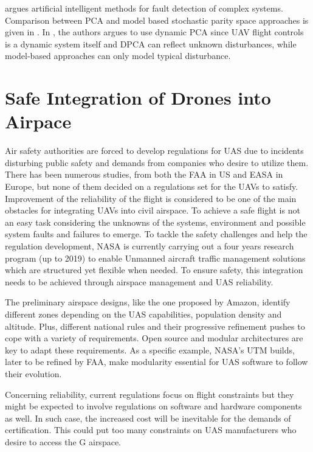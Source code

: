 \cite{gui2002fault} argues artificial intelligent methods for fault detection of complex 
systems. Comparison between PCA and model based stochastic parity space 
approaches is given in \cite{hagenblad2004comparison}.
In \cite{li2016data}, the authors argues to use dynamic PCA since UAV flight 
controls is a dynamic system itself and DPCA can reflect unknown disturbances, 
while model-based approaches can only model typical disturbance.  


\section{Safe Integration of Drones into Airpace}
Air safety authorities are forced to develop regulations for UAS due to incidents 
disturbing public safety and demands from companies who desire to utilize them. 
There has been numerous studies, from both the FAA in US and EASA in Europe, 
but none of them decided on a regulations set for the UAVs to satisfy. Improvement 
of the reliability of the flight is considered to be one of the main obstacles for 
integrating UAVs into civil airspace. To achieve a safe flight is not an easy task 
considering the unknowns of the systems, environment and possible system faults 
and failures to emerge. To tackle the safety challenges and help the regulation 
development, NASA is currently carrying out a four years research program (up to 2019) 
to enable Unmanned aircraft traffic management solutions which are structured yet 
flexible when needed. To ensure safety, this integration needs to be achieved through 
airspace management and UAS reliability.

The preliminary airspace designs, like the one proposed by Amazon, identify different 
zones depending on the UAS capabilities, population density and altitude. Plus, 
different national rules and their progressive refinement pushes to cope with a variety 
of requirements. Open source and modular architectures are key to adapt these 
requirements. As a specific example, NASA's UTM builds, later to be refined by FAA, 
make modularity essential for UAS software to follow their evolution. 

Concerning reliability, current regulations focus on flight constraints but they might be 
expected to involve regulations on software and hardware components as well. 
In such case, the increased cost will be inevitable for the demands of certification. 
This could put too many constraints on UAS manufacturers who desire to access the G airspace. 

